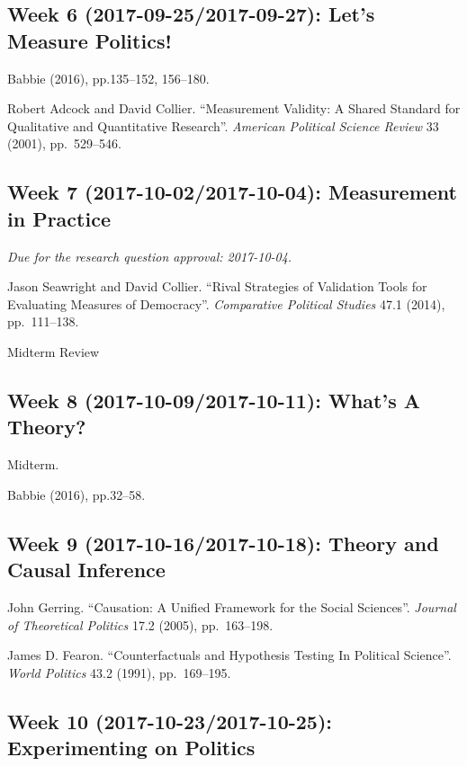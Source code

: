 \documentclass[11pt,]{article}
\theoremstyle{definition}
\theoremstyle{definition}
\theoremstyle{definition}
\theoremstyle{remark}
\begin{document}
\subsection{Week 6 (2017-09-25/2017-09-27): Let's Measure
Politics!}\label{week-6-2017-09-252017-09-27-lets-measure-politics}

Babbie (2016), pp.135--152, 156--180.

Robert Adcock and David Collier. ``Measurement Validity: A Shared
Standard for Qualitative and Quantitative Research''.
\emph{American Political Science Review} 33 (2001), pp.~529--546.

\subsection{Week 7 (2017-10-02/2017-10-04): Measurement in
Practice}\label{week-7-2017-10-022017-10-04-measurement-in-practice}

\emph{Due for the research question approval: 2017-10-04.}

Jason Seawright and David Collier. ``Rival Strategies of Validation
Tools for Evaluating Measures of Democracy''.
\emph{Comparative Political Studies} 47.1 (2014), pp.~111--138.

Midterm Review

\subsection{Week 8 (2017-10-09/2017-10-11): What's A
Theory?}\label{week-8-2017-10-092017-10-11-whats-a-theory}

Midterm.

Babbie (2016), pp.32--58.

\subsection{Week 9 (2017-10-16/2017-10-18): Theory and Causal
Inference}\label{week-9-2017-10-162017-10-18-theory-and-causal-inference}

John Gerring. ``Causation: A Unified Framework for the Social
Sciences''. \emph{Journal of Theoretical Politics} 17.2 (2005),
pp.~163--198.

James D. Fearon. ``Counterfactuals and Hypothesis Testing In Political
Science''. \emph{World Politics} 43.2 (1991), pp.~169--195.

\subsection{Week 10 (2017-10-23/2017-10-25): Experimenting on
Politics}\label{week-10-2017-10-232017-10-25-experimenting-on-politics}
\end{document}
